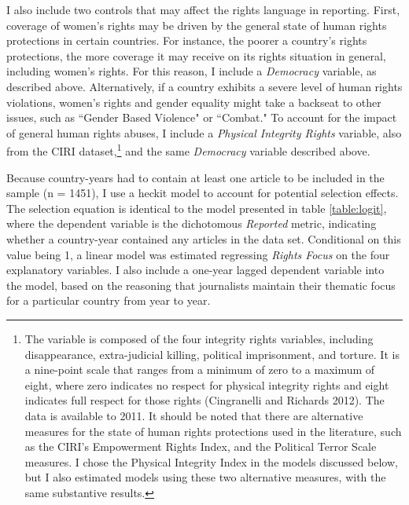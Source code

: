 \documentclass[11pt, oneside]{article}
\begin{document}
I also include two controls that may affect the rights language in reporting. First, coverage of women's rights may be driven by the general state of human rights protections in certain countries. For instance, the poorer a country's rights protections, the more coverage it may receive on its rights situation in general, including women's rights. For this reason, I include a \emph{Democracy} variable, as described above. Alternatively, if a country exhibits a severe level of human rights violations, women's rights and gender equality might take a backseat to other issues, such as ``Gender Based Violence" or ``Combat." To account for the impact of general human rights abuses, I include a \emph{Physical Integrity Rights} variable, also from the CIRI dataset,\footnote{The variable is composed of the four integrity rights variables, including disappearance, extra-judicial killing, political imprisonment, and torture. It is a nine-point scale that ranges from a minimum of zero to a maximum of eight, where zero indicates no respect for physical integrity rights and eight indicates full respect for those rights (Cingranelli and Richards 2012). The data is available to 2011. It should be noted that there are alternative measures for the state of human rights protections used in the literature, such as the CIRI's Empowerment Rights Index, and the Political Terror Scale measures. I chose the Physical Integrity Index in the models discussed below, but I also estimated models using these two alternative measures, with the same substantive results.} and the same \emph{Democracy} variable described above.

Because country-years had to contain at least one article to be included in the sample (n = 1451), I use a heckit model to account for potential selection effects. The selection equation is identical to the model presented in table \ref{table:logit}, where the dependent variable is the dichotomous \emph{Reported} metric, indicating whether a country-year contained any articles in the data set. Conditional on this value being 1, a linear model was estimated regressing \emph{Rights Focus} on the four explanatory variables. I also include a one-year lagged dependent variable into the model, based on the reasoning that journalists maintain their thematic focus for a particular country from year to year. 
\end{document}
